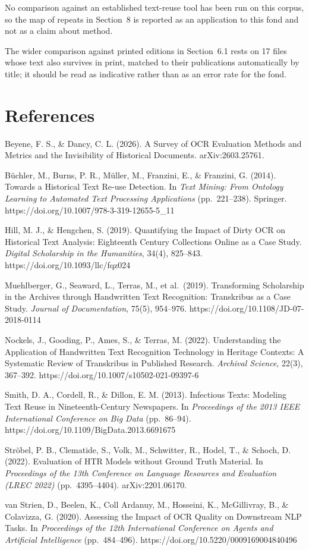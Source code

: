 \documentclass[11pt,a4paper]{article}
\begin{document}
No comparison against an established text-reuse tool has been run on this
corpus, so the map of repeats in Section~8 is reported as an application to
this fond and not as a claim about method.

The wider comparison against printed editions in Section~6.1 rests on 17 files
whose text also survives in print, matched to their publications automatically
by title; it should be read as indicative rather than as an error rate for the
fond.

\section{References}\label{references}

Beyene, F. S., \& Dancy, C. L. (2026). A Survey of OCR Evaluation Methods and
Metrics and the Invisibility of Historical Documents. arXiv:2603.25761.

Büchler, M., Burns, P. R., Müller, M., Franzini, E., \& Franzini, G. (2014).
Towards a Historical Text Re-use Detection. In \emph{Text Mining: From Ontology
Learning to Automated Text Processing Applications} (pp.~221--238). Springer.
https://doi.org/10.1007/978-3-319-12655-5\_11

Hill, M. J., \& Hengchen, S. (2019). Quantifying the Impact of Dirty OCR on
Historical Text Analysis: Eighteenth Century Collections Online as a Case
Study. \emph{Digital Scholarship in the Humanities}, 34(4), 825--843.
https://doi.org/10.1093/llc/fqz024

Muehlberger, G., Seaward, L., Terras, M., et al.~(2019). Transforming
Scholarship in the Archives through Handwritten Text Recognition: Transkribus
as a Case Study. \emph{Journal of Documentation}, 75(5), 954--976.
https://doi.org/10.1108/JD-07-2018-0114

Nockels, J., Gooding, P., Ames, S., \& Terras, M. (2022). Understanding the
Application of Handwritten Text Recognition Technology in Heritage Contexts: A
Systematic Review of Transkribus in Published Research. \emph{Archival Science},
22(3), 367--392. https://doi.org/10.1007/s10502-021-09397-6

Smith, D. A., Cordell, R., \& Dillon, E. M. (2013). Infectious Texts: Modeling
Text Reuse in Nineteenth-Century Newspapers. In \emph{Proceedings of the 2013 IEEE
International Conference on Big Data} (pp.~86--94).
https://doi.org/10.1109/BigData.2013.6691675

Ströbel, P. B., Clematide, S., Volk, M., Schwitter, R., Hodel, T., \& Schoch,
D. (2022). Evaluation of HTR Models without Ground Truth Material. In
\emph{Proceedings of the 13th Conference on Language Resources and Evaluation (LREC
2022)} (pp.~4395--4404). arXiv:2201.06170.

van Strien, D., Beelen, K., Coll Ardanuy, M., Hosseini, K., McGillivray, B., \&
Colavizza, G. (2020). Assessing the Impact of OCR Quality on Downstream NLP
Tasks. In \emph{Proceedings of the 12th International Conference on Agents and
Artificial Intelligence} (pp.~484--496).
https://doi.org/10.5220/0009169004840496
\end{document}
